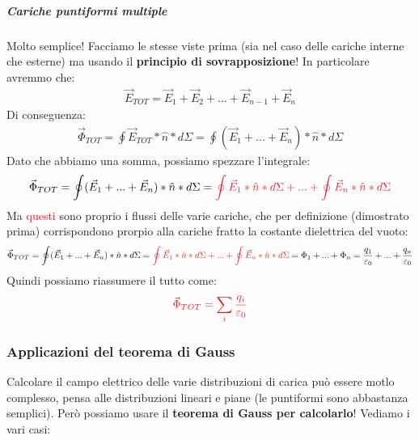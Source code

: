                 \subparagraph{Cariche puntiformi multiple}
                    Molto semplice! Facciamo le stesse viste prima (sia nel caso delle cariche interne che esterne) ma usando il \textbf{principio di sovrapposizione}! In particolare avremmo che:
                    \begin{align*}
                        \vec{E}_{TOT} = \vec{E}_{1}+\vec{E}_{2}+...+\vec{E}_{n-1}+\vec{E}_{n}
                    \end{align*}
                    Di conseguenza:
                    \begin{align*}
                        \vec{\Phi}_{TOT} = \oint \vec{E}_{TOT}*\hat{n}*d\Sigma= \oint(\vec{E}_{1}+...+\vec{E}_{n})*\hat{n}*d\Sigma
                    \end{align*}
                    Dato che abbiamo una somma, possiamo spezzare l'integrale:
                    \begin{align*}
                        \vec{\Phi}_{TOT}=\oint(\vec{E}_{1}+...+\vec{E}_{n})*\hat{n}*d\Sigma=\textcolor{Red}{\oint \vec{E}_{1}*\hat{n}*d\Sigma+...+\oint \vec{E}_{n}*\hat{n}*d\Sigma}
                    \end{align*}
                    Ma \textcolor{Red}{questi} sono proprio i flussi delle varie cariche, che per definizione (dimostrato prima) corrispondono prorpio alla cariche fratto la costante dielettrica del vuoto:
                    \begin{align*}
                        \vec{\Phi}_{TOT}=\oint(\vec{E}_{1}+...+\vec{E}_{n})*\hat{n}*d\Sigma=\textcolor{Red}{\oint \vec{E}_{1}*\hat{n}*d\Sigma+...+\oint \vec{E}_{n}*\hat{n}*d\Sigma}= \Phi_1+...+\Phi_n = \frac{q_1}{\varepsilon_0}+...+\frac{q_n}{\varepsilon_0}
                    \end{align*}
                    Quindi possiamo riassumere il tutto come:
                    \begin{align*}
                        \textcolor{Red}{\vec{\Phi}_{TOT}=\sum_i\frac{q_i}{\varepsilon_0}}
                    \end{align*}

            \subsubsection{Applicazioni del teorema di Gauss}
                Calcolare il campo elettrico delle varie distribuzioni di carica può essere motlo complesso, pensa alle distribuzioni lineari e piane (le puntiformi sono abbastanza semplici). Però possiamo usare il \textbf{teorema di Gauss per calcolarlo}! Vediamo i vari casi:

